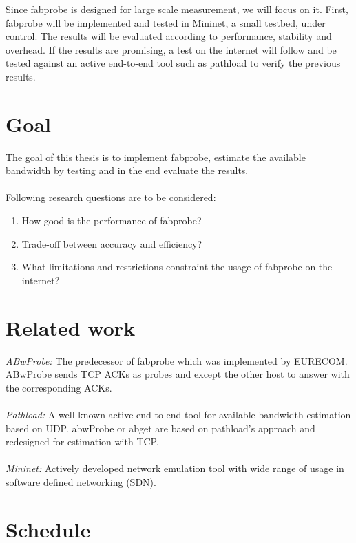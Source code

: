 \documentclass[NET,a4,12pt,english]{netforms}
\begin{document}
Since fabprobe is designed for large scale measurement, we will focus on it. First, fabprobe will be implemented and tested in Mininet, a small testbed, under control. 
The results will be evaluated according to performance, stability and overhead. If the results are promising, a test on the internet will follow and be tested against an active end-to-end tool such as pathload to verify the previous results.
\section*{Goal}
\label{ref:goal}
The goal of this thesis is to implement fabprobe, estimate the available bandwidth by testing and in the end evaluate the results. \\
\\
Following research questions are to be considered:

\begin{enumerate}
	\item How good is the performance of fabprobe?
	\item Trade-off between accuracy and efficiency?
	\item What limitations and restrictions constraint the usage of fabprobe on the internet?
\end{enumerate} 

\section*{Related work}
\textit{ABwProbe:} The predecessor of fabprobe which was implemented by EURECOM.   %
ABwProbe sends TCP ACKs as probes and except the other host to answer with the corresponding ACKs. \cite{abwprobe} \\
\\ \textit{Pathload:}  A well-known active end-to-end tool for available bandwidth estimation based on UDP. abwProbe or abget are based on pathload's approach and redesigned for estimation with TCP. \cite{pathload} \\%
\\ \textit{Mininet:} Actively developed network emulation tool with wide range of usage in software defined networking (SDN). \cite{mininet}
\section*{Schedule}
\end{document}
